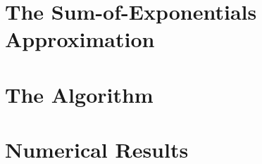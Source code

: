 \section{The Sum-of-Exponentials Approximation}

\section{The Algorithm}

\section{Numerical Results}
